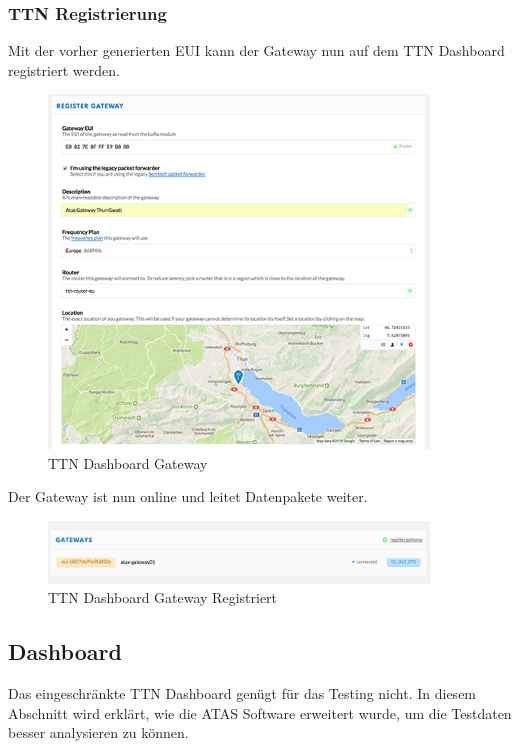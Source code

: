 \documentclass[11pt,english,german]{report}
\theoremstyle{definition}
\begin{document}
\subsubsection{TTN Registrierung}
Mit der vorher generierten EUI kann der Gateway nun auf dem TTN Dashboard registriert werden.
\begin{figure}[H]
	\centering
	\includegraphics[width=0.9\textwidth]{img/gateway/ttn_gateway.png}
	\caption[TTN Dashboard Gateway]
	{TTN Dashboard Gateway}
\end{figure}
\noindent
Der Gateway ist nun online und leitet Datenpakete weiter.
\begin{figure}[H]
	\centering
	\includegraphics[width=0.9\textwidth]{img/gateway/ttn_gateway_done.png}
	\caption[TTN Dashboard Gateway Registriert]
	{TTN Dashboard Gateway Registriert}
\end{figure}

\newpage
\subsection{Dashboard}
Das eingeschränkte TTN Dashboard genügt für das Testing nicht. In diesem Abschnitt wird erklärt, wie die ATAS Software erweitert wurde, um die Testdaten besser analysieren zu können.
\end{document}

